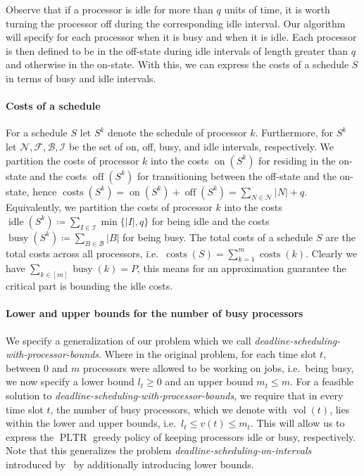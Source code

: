 \documentclass[a4paper]{article}
\DeclareMathOperator{\on}{on}
\DeclareMathOperator{\off}{off}
\DeclareMathOperator{\idle}{idle}
\DeclareMathOperator{\busy}{busy}
\DeclareMathOperator{\costs}{costs}
\DeclareMathOperator{\PLTR}{PLTR}
\DeclareMathOperator{\vol}{vol}
\begin{document}
Observe that if a processor is idle for more than $q$ units of time, it is worth turning the processor off during the corresponding idle interval.
Our algorithm will specify for each processor when it is busy and when it is idle.
Each processor is then defined to be in the off-state during idle intervals of length greater than $q$ and otherwise in the on-state.
With this, we can express the costs of a schedule $S$ in terms of busy and idle intervals.

\paragraph{Costs of a schedule}
For a schedule $S$ let $S^k$ denote the schedule of processor $k$.
Furthermore, for $S^k$ let $\mathcal{N}, \mathcal{F}, \mathcal{B}, \mathcal{I}$ be the set of on, off, busy, and idle intervals, respectively.
We partition the costs of processor $k$ into the costs $\on(S^k)$ for residing in the on-state and the costs $\off(S^k)$ for transitioning between the off-state and the on-state, hence $\costs(S^k) = \on(S^k) + \off(S^k) = \sum_{N \in \mathcal{N}} |N| + q$.
Equivalently, we partition the costs of processor $k$ into the costs $\idle(S^k) \coloneqq \sum_{I \in \mathcal{I}} \min \{ |I|, q \}$ for being idle and the costs $\busy(S^k) \coloneqq \sum_{B \in \mathcal{B}} |B|$ for being busy.
The total costs of a schedule $S$ are the total costs across all processors, i.e.\ $\costs(S) = \sum_{k = 1}^{m} \costs(k)$.
Clearly we have $\sum_{k \in [m]} \busy(k) = P$, this means for an approximation guarantee the critical part is bounding the idle costs.

\paragraph{Lower and upper bounds for the number of busy processors}
We specify a generalization of our problem which we call \emph{deadline-scheduling-with-processor-bounds}.
Where in the original problem, for each time slot $t$, between $0$ and $m$ processors were allowed to be working on jobs, i.e.\ being busy, we now specify a lower bound $l_t \geq 0$ and an upper bound $m_t \leq m$.
For a feasible solution to \emph{deadline-scheduling-with-processor-bounds}, we require that in every time slot $t$, the number of busy processors, which we denote with $\vol(t)$, lies within the lower and upper bounds, i.e.\ $l_t \leq v(t) \leq m_t$.
This will allow us to express the $\PLTR$ greedy policy of keeping processors idle or busy, respectively.
Note that this generalizes the problem \emph{deadline-scheduling-on-intervals} introduced by~\cite{antoniadis} by additionally introducing lower bounds.
\end{document}
